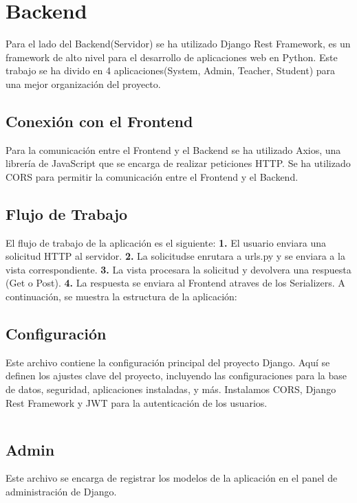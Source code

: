 \documentclass{article}
\begin{document}
\section{Backend}
Para el lado del Backend(Servidor) se ha utilizado Django Rest Framework, es un framework de alto nivel para el desarrollo de aplicaciones web en Python. Este trabajo se ha divido en 4 aplicaciones(System, Admin, Teacher, Student) para una mejor organización del proyecto.
\subsection{Conexión con el Frontend}
Para la comunicación entre el Frontend y el Backend se ha utilizado Axios, una librería de JavaScript que se encarga de realizar peticiones HTTP. Se ha utilizado CORS para permitir la comunicación entre el Frontend y el Backend.

\subsection{Flujo de Trabajo}
El flujo de trabajo de la aplicación es el siguiente:\newline
\textbf{1.} El usuario enviara una solicitud HTTP al servidor.\newline
\textbf{2.} La solicitudse enrutara a urls.py y se enviara a la vista correspondiente.\newline
\textbf{3.} La vista procesara la solicitud y devolvera una respuesta (Get o Post).\newline
\textbf{4.} La respuesta se enviara al Frontend atraves de los Serializers.
\newline
\newline
A continuación, se muestra la estructura de la aplicación:

\subsection{Configuración}
Este archivo contiene la configuración principal del proyecto Django. Aquí se definen los ajustes clave del proyecto, incluyendo las configuraciones para la base de datos, seguridad, aplicaciones instaladas, y más.
Instalamos CORS, Django Rest Framework y JWT para la autenticación de los usuarios.
\inputminted{python3}{../backend/coderdojo/settings.py}

\subsection{Admin}
Este archivo se encarga de registrar los modelos de la aplicación en el panel de administración de Django.
\inputminted{python3}{../backend/system/admin.py}
\end{document}

